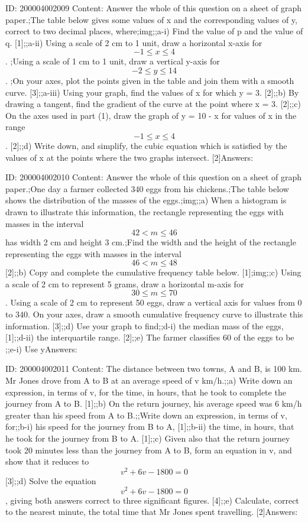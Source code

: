 \documentclass{article}
\begin{document}
ID: 200004002009
Content:
Answer the whole of this question on a sheet of graph paper.;The table below gives some values of x and the corresponding values of y, correct to two decimal places, where;img;;a-i) Find the value of p and the value of q. [1];;a-ii) Using a scale of 2 cm to 1 unit, draw a horizontal x-axis for $$-1 \leq x \leq 4$$. ;Using a scale of 1 cm to 1 unit, draw a vertical y-axis for $$-2 \leq y \leq 14$$. ;On your axes, plot the points given in the table and join them with a smooth curve. [3];;a-iii) Using your graph, find the values of x for which y = 3. [2];;b) By drawing a tangent, find the gradient of the curve at the point where x = 3. [2];;c) On the axes used in part (1), draw the graph of y = 10 - x for values of x in the range $$-1 \leq x \leq 4$$. [2];;d) Write down, and simplify, the cubic equation which is satisfied by the values of x at the points where the two graphs intersect. [2]Answers:

ID: 200004002010
Content:
Answer the whole of this question on a sheet of graph paper.;One day a farmer collected 340 eggs from his chickens.;The table below shows the distribution of the masses of the eggs.;img;;a) When a histogram is drawn to illustrate this information, the rectangle representing the eggs with masses in the interval $$42 < m \leq 46$$ has width 2 cm and height 3 cm.;Find the width and the height of the rectangle representing the eggs with masses in the interval $$46 < m \leq 48$$ [2];;b) Copy and complete the cumulative frequency table below. [1];img;;c) Using a scale of 2 cm to represent 5 grams, draw a horizontal m-axis for $$30 \leq m \leq 70$$. Using a scale of 2 cm to represent 50 eggs, draw a vertical axis for values from 0 to 340. On your axes, draw a smooth cumulative frequency curve to illustrate this information. [3];;d) Use your graph to find;;d-i) the median mass of the eggs, [1];;d-ii) the interquartile range. [2];;e) The farmer classifies 60 of the eggs to be ;;e-i) Use yAnswers:

ID: 200004002011
Content:
The distance between two towns, A and B, is 100 km. Mr Jones drove from A to B at an average speed of v km/h.;;a) Write down an expression, in terms of v, for the time, in hours, that he took to complete the journey from A to B. [1];;b) On the return journey, his average speed was 6 km/h greater than his speed from A to B.;;Write down an expression, in terms of v, for;;b-i) his speed for the journey from B to A, [1];;b-ii) the time, in hours, that he took for the journey from B to A. [1];;c) Given also that the return journey took 20 minutes less than the journey from A to B, form an equation in v, and show that it reduces to $$v^2 + 6v - 1800 = 0$$ [3];;d) Solve the equation $$v^2 + 6v - 1800 = 0$$, giving both answers correct to three significant figures. [4];;e) Calculate, correct to the nearest minute, the total time that Mr Jones spent travelling. [2]Answers:
\end{document}

